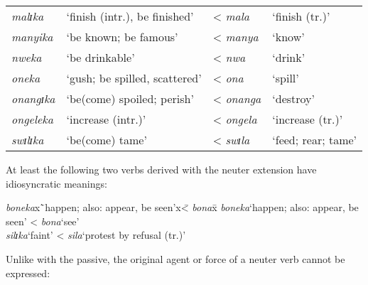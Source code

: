 \begin{exe}
\ex \label{exNeuterListe}
\begin{tabular}[t]{llll}
\textit{malɪka}&`finish (intr.), be finished'& < \textit{mala}&`finish (tr.)'\\
\textit{manyika}&`be known; be famous'& < \textit{manya}&`know'\\
\textit{nweka}&`be drinkable'& < \textit{nwa}&`drink'\\
\textit{oneka}&`gush; be spilled, scattered'& < \textit{ona}&`spill'\\
\textit{onangɪka}&\lq be(come) spoiled; perish'& < \textit{onanga}& \lq destroy'\\
\textit{ongeleka}&`increase (intr.)'& < \textit{ongela}& \lq increase (tr.)'\\
\textit{swɪlɪka}&`be(come) tame'& < \textit{swɪla}&`feed; rear; tame'
\end{tabular}
\end{exe}

At least the following two verbs derived with the neuter extension have idiosyncratic meanings:
\begin{exe}
\ex
\begin{tabbing}
\textit{boneka}x\=`happen; also: appear, be seen'x\= < \textit{bona}x\=\kill %
\textit{boneka}\>`happen; also: appear, be seen'\> < \textit{bona}\>`see'\\
\textit{silɪka}\>`faint'\> < \textit{sila}\>`protest by refusal (tr.)'
\end{tabbing}
\end{exe}

Unlike with the passive, the original agent or force of a neuter verb cannot be expressed:
\begin{exe}
\end{exe}

